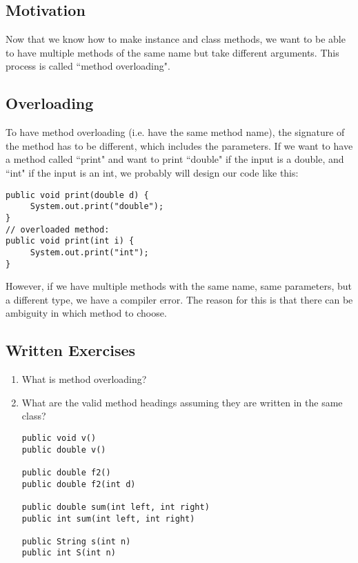 
\subsection{Motivation}
Now that we know how to make instance and class methods, we want to be able to have multiple methods of the same name but take different arguments. This process is called ``method overloading".

\subsection{Overloading}
To have method overloading (i.e. have the same method name), the signature of the method has to be different, which includes the parameters. If we want to have a method called ``print" and want to print ``double" if the input is a double, and ``int" if the input is an int, we probably will design our code like this:
\begin{lstlisting}
public void print(double d) {
     System.out.print("double");
}
// overloaded method:
public void print(int i) {
     System.out.print("int");
}
\end{lstlisting}
However, if we have multiple methods with the same name, same parameters, but a different type, we have a compiler error. The reason for this is that there can be ambiguity in which method to choose.

\subsection{Written Exercises}

\setcounter{counter}{1}
\begin{enumerate}[label={\arabic{counter}\addtocounter{counter}{1}}.]

\item What is method overloading? 

\item What are the valid method headings assuming they are written in the same class?
\begin{lstlisting}
public void v()
public double v()

public double f2()
public double f2(int d)

public double sum(int left, int right)
public int sum(int left, int right)

public String s(int n)
public int S(int n)
\end{lstlisting}

\end{enumerate}